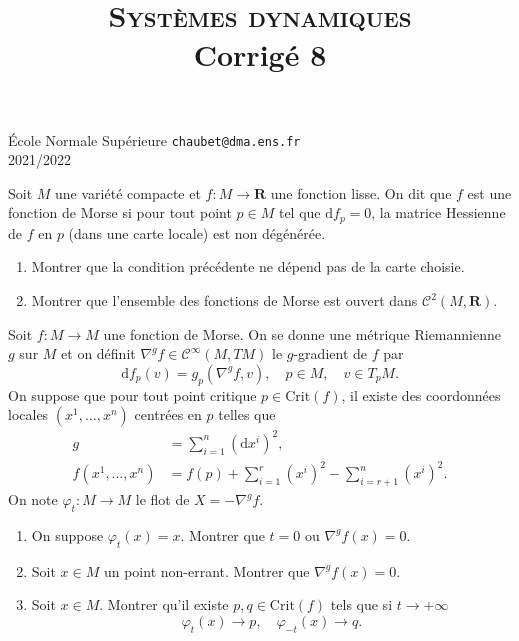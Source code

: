 \documentclass[a4paper,10pt,openany]{article}
\title{\textsc{Syst\`emes dynamiques} \\ Corrig\'e 8}
\date{}
\author{}
\theoremstyle{plain}
\theoremstyle{definition}
\newcommand{\dd}{\mathrm{d}}
\newcommand{\R}{\mathbf{R}}
\begin{document}
{\noindent \'Ecole Normale Sup\'erieure  \hfill  \texttt{chaubet@dma.ens.fr} } \\
{2021/2022 \hfill}

{\let\newpage\relax\maketitle}
\maketitle
{} \vspace{1.5mm} 

\noindent Soit $M$ une vari\'et\'e compacte et $f : M \to \R$ une fonction lisse. On dit que $f$ est une fonction de Morse si pour tout point $p \in M$ tel que $\dd f_p = 0$, la matrice Hessienne de $f$ en $p$ (dans une carte locale) est non d\'eg\'en\'er\'ee.
\begin{enumerate}
\item Montrer que la condition pr\'ec\'edente ne d\'epend pas de la carte choisie.
\item Montrer que l'ensemble des fonctions de Morse est ouvert dans $\mathcal{C}^2(M, \R).$
\end{enumerate}
Soit $f : M \to M$ une fonction de Morse. On se donne une m\'etrique Riemannienne $g$ sur $M$ et on d\'efinit $\nabla^g f \in \mathcal{C}^\infty(M,TM)$ le $g$-gradient de $f$ par
$$
\dd f_p(v) = g_p(\nabla^g f, v), \quad p \in M, \quad v \in T_pM.
$$
On suppose que pour tout point critique $p \in \mathrm{Crit}(f)$, il existe des coordonn\'ees locales $(x^1, \dots, x^n)$ centr\'ees en $p$ telles que
$$
\begin{aligned}
g &= \sum_{i=1}^n (\dd x^i)^2, \\
f(x^1, \dots, x^n) &= f(p) + \sum_{i=1}^r (x^i)^2 - \sum_{i=r+1}^n (x^i)^2.
\end{aligned}
$$
On note $\varphi_t : M \to M$ le flot de $X = -\nabla^gf$.
\begin{enumerate}[resume]
\item On suppose $\varphi_t(x) = x$. Montrer que $t = 0$ ou $\nabla^gf (x) = 0$.
\item Soit $x \in M$ un point non-errant. Montrer que $\nabla^g f(x) = 0$.
\item Soit $x \in M$. Montrer qu'il existe $p,q \in \mathrm{Crit}(f)$ tels que si $t \to +\infty$
$$
\varphi_t(x) \to p, \quad \varphi_{-t}(x) \to q.
$$
\end{enumerate}
\end{document}
